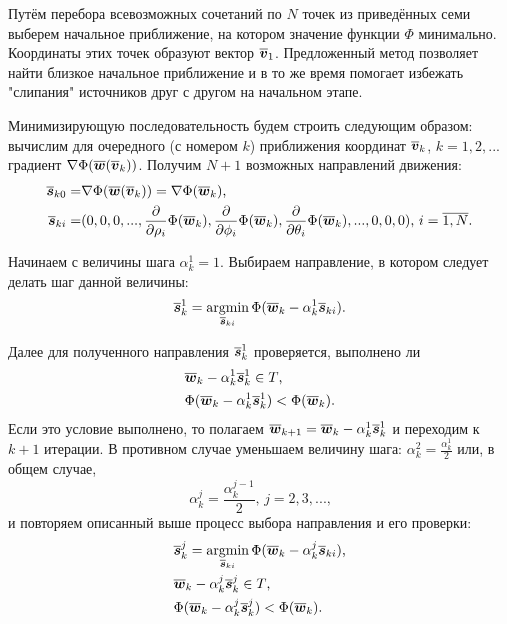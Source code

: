Путём перебора всевозможных сочетаний по $N$ точек из приведённых семи выберем начальное приближение, на котором значение функции $\Phi$ минимально. Координаты этих точек образуют вектор $\boldsymbol{\overline{v}}_1$. Предложенный метод позволяет найти близкое начальное приближение и в то же время помогает избежать "слипания" источников друг с другом на начальном этапе.

Минимизирующую последовательность будем строить следующим образом: вычислим для очередного (с номером $k$) приближения координат $\boldsymbol{\overline{v}}_k$, $k=1,2,...$ градиент $\nabla \Phi(\boldsymbol{\overline{w}}(\boldsymbol{\overline{v}}_k))$. Получим $N + 1$ возможных направлений движения:
\begin{align}
    \boldsymbol{\overline{s}}_{k0} =& \nabla \Phi(\boldsymbol{\overline{w}}(\boldsymbol{\overline{v}}_k))
    =
    \nabla \Phi(\boldsymbol{\overline{w}}_k)
    \text{,}\\
    \boldsymbol{\overline{s}}_{ki} =& (0,0,0,...,
    \frac{\partial}{\partial \rho_i} \Phi(\boldsymbol{\overline{w}}_k),
    \frac{\partial}{\partial \phi_i} \Phi(\boldsymbol{\overline{w}}_k),
    \frac{\partial}{\partial \theta_i} \Phi(\boldsymbol{\overline{w}}_k),
    ...,0,0,0)
    \text{, }
    i = \overline{1,N}
    \text{.}
\end{align}

Начинаем с величины шага $\alpha_k^1 = 1$. Выбираем направление, в котором следует делать шаг данной величины:
\begin{equation}
    \boldsymbol{\overline{s}}_k^1 = \operatorname*{argmin}_{\boldsymbol{\overline{s}}_{ki}} \Phi(\boldsymbol{\overline{w}}_k - \alpha_k^1 \boldsymbol{\overline{s}}_{ki}) \text{.}
\end{equation}

Далее для полученного направления $\boldsymbol{\overline{s}}_k^1$ проверяется, выполнено ли
\begin{align}
    &\boldsymbol{\overline{w}}_k - \alpha_k^1 \boldsymbol{\overline{s}}_k^1 \in T \text{,}\\
    &\Phi(\boldsymbol{\overline{w}}_k - \alpha_k^1 \boldsymbol{\overline{s}}_k^1) < \Phi(\boldsymbol{\overline{w}}_k) \text{.}
\end{align}
Если это условие выполнено, то полагаем $\boldsymbol{\overline{w}}_{k+1} = \boldsymbol{\overline{w}}_{k} - \alpha_k^1 \boldsymbol{\overline{s}}_k^1$ и переходим к $k + 1$ итерации. В противном случае уменьшаем величину шага: $\alpha_k^{2} = \frac{\alpha_k^1}{2}$ или, в общем случае,
\begin{equation}
    \alpha_k^{j} = \frac{\alpha_k^{j - 1}}{2} \text{, } j = 2,3,... \text{,}
\end{equation}
 и повторяем описанный выше процесс выбора направления и его проверки:
\begin{align}
    &\boldsymbol{\overline{s}}_k^j = \operatorname*{argmin}_{\boldsymbol{\overline{s}}_{ki}} \Phi(\boldsymbol{\overline{w}}_k - \alpha_k^j \boldsymbol{\overline{s}}_{ki}) \text{,}\\
    &\boldsymbol{\overline{w}}_k - \alpha_k^j \boldsymbol{\overline{s}}_k^j \in T \text{,}\\
    &\Phi(\boldsymbol{\overline{w}}_k - \alpha_k^j \boldsymbol{\overline{s}}_k^j) < \Phi(\boldsymbol{\overline{w}}_k) \text{.}
\end{align}


